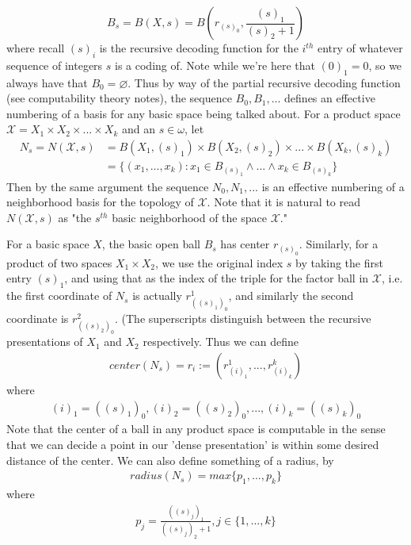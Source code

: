 \documentclass{article}
\theoremstyle{definition}
\theoremstyle{plain}
\begin{document}
\[ B_s = B(X,s) = B(r_{(s)_0},\frac{(s)_1}{(s)_2+1}) \]
where recall $(s)_i$ is the recursive decoding function for the $i^{th}$ entry of whatever sequence of integers $s$ is a coding of. Note while we're here that $(0)_1 = 0$, so we always have that $B_0 = \varnothing$. Thus by way of the partial recursive decoding function (see computability theory notes), the sequence $B_0,B_1,...$ defines an effective numbering of a basis for any basic space being talked about. For a product space $\mathcal{X} = X_1 \times X_2 \times ... \times X_k$ and an $s \in \omega$, let 
\begin{align}
    N_s = N(\mathcal{X},s) &= B(X_1,(s)_1) \times B(X_2,(s)_2) \times ... \times B(X_k,(s)_k) \\
                &= \{(x_1,...,x_k): x_1 \in B_{(s)_1} \wedge ... \wedge x_k \in B_{(s)_k}\}
\end{align} 
Then by the same argument the sequence $N_0,N_1,...$ is an effective numbering of a neighborhood basis for the topology of $\mathcal{X}$. Note that it is natural to read $N(\mathcal{X},s)$ as "the $s^{th}$ basic neighborhood of the space $\mathcal{X}$." 
\par For a basic space $X$, the basic open ball $B_s$ has center $r_{(s)_0}$. Similarly, for a product of two spaces $X_1 \times X_2$, we use the original index $s$ by taking the first entry $(s)_1$, and using that as the index of the triple for the factor ball in $\mathcal{X}$, i.e. the first coordinate of $N_s$ is actually $r^1_{((s)_1)_0}$, and similarly the second coordinate is $r^2_{((s)_2)_0}$. (The superscripts distinguish between the recursive presentations of $X_1$ and $X_2$ respectively. Thus we can define
\begin{align}
    center(N_s) = r_i := (r^1_{(i)_1},...,r^k_{(i)_k})
\end{align}
where
\begin{align}
    (i)_1 = ((s)_1)_0, (i)_2 = ((s)_2)_0,...,(i)_k = ((s)_k)_0
\end{align}
Note that the center of a ball in any product space is computable in the sense that we can decide a point in our 'dense presentation' is within some desired distance of the center. We can also define something of a radius, by
\begin{align}
    radius(N_s) = max\{p_1,...,p_k\}
\end{align}
where
\begin{align}
    p_j = \frac{((s)_j)_1}{((s)_j)_2+1}, j \in \{1,...,k\}
\end{align}
\end{document}
